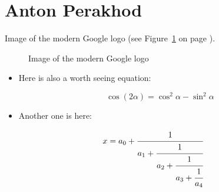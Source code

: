 
\section{Anton Perakhod}
 

\label{sec:Anton Perakhod}

Image of the modern Google logo (see Figure~\ref{fig:google_logo} on page \pageref {fig:google_logo}).

\begin{figure}[htbp]
    \caption{Image of the modern Google logo}
    \label{fig:google_logo}
\end{figure}

\begin{itemize}
\item 
Here is also a worth seeing equation:

\[\cos (2\alpha) = \cos^2 \alpha - \sin^2 \alpha\]

\item
Another one is here:
 \end{itemize}

  \[x = a_0 + \cfrac{1}{a_1 
          + \cfrac{1}{a_2 
          + \cfrac{1}{a_3 + \cfrac{1}{a_4} } } } \]
\newpage

